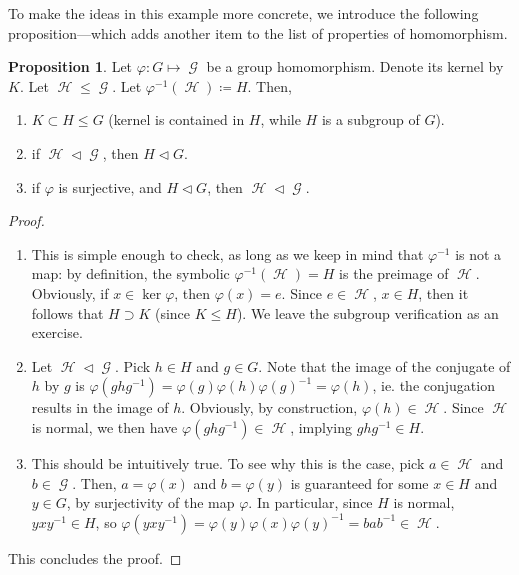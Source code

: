 \documentclass[11pt]{amsart} %
\theoremstyle{definition}
\newtheorem{proposition}[definition]{Proposition}
\theoremstyle{definition}
\DeclareMathOperator{\GG}{\mathcal{G}}
\DeclareMathOperator{\HH}{\mathcal{H}}
\numberwithin{equation}{section}
\begin{document}
To make the ideas in this example more concrete, we introduce the following proposition---which adds another item to the list of properties of homomorphism.

\begin{proposition}
	\label{propsubgroupsrelationsinhomomorphism}
	Let $\varphi: G \mapsto \GG$ be a group homomorphism. Denote its kernel by $K$. Let $\HH \leq \GG$. Let $\varphi^{-1} (\HH) \coloneqq H$. Then,
	\begin{enumerate}
		\item $K \subset H \leq G$ (kernel is contained in $H$, while $H$ is a subgroup of $G$).
		\item if $\HH \lhd \GG$, then $H \lhd G$.
		\item if $\varphi$ is surjective, and $H \lhd G$, then $\HH \lhd \GG$.
	\end{enumerate}
\end{proposition}

\begin{proof}
	\begin{enumerate}
		\item This is simple enough to check, as long as we keep in mind that $\varphi^{-1}$ is not a map: by definition, the symbolic $\varphi^{-1} (\HH) = H$ is the preimage of $\HH$. Obviously, if $x \in \ker \varphi$, then $\varphi(x) =e$. Since $e \in \HH$, $x \in H$, then it follows that $H \supset K$ (since $K \leq H$). We leave the subgroup verification as an exercise.
		
		
		\item Let $\HH \lhd \GG$. Pick $h \in H$ and $g \in G$. Note that the image of the conjugate of $h$ by $g$ is $\varphi(ghg^{-1}) = \varphi(g) \varphi(h) \varphi(g)^{-1} = \varphi(h)$, ie. the conjugation results in the image of $h$. Obviously, by construction, $\varphi(h) \in \HH$. Since $\HH$ is normal, we then have $\varphi(ghg^{-1}) \in \HH$, implying $ghg^{-1} \in H$. 
		
		
		\item This should be intuitively true. To see why this is the case, pick $a \in \HH$ and $b \in \GG$. Then, $a = \varphi(x)$ and $b = \varphi(y)$ is guaranteed for some $x \in H$ and $y \in G$, by surjectivity of the map $\varphi$. In particular, since $H$ is normal, $yxy^{-1} \in H$, so $\varphi(yxy^{-1}) = \varphi(y) \varphi(x) \varphi(y)^{-1} = bab^{-1} \in \HH$.
	\end{enumerate}
This concludes the proof.
\end{proof}
\end{document}
